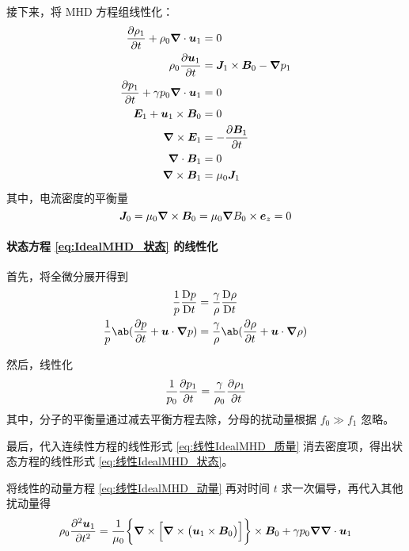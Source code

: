接下来，将 MHD 方程组线性化：
\begin{subequations}\begin{align}
\pdv{\rho_1}{t} + \rho_0 \bm{\nabla} \cdot{\bm{u}_1} &= 0
\label{eq:线性IdealMHD_质量} \\
\rho_0 \pdv{\bm{u}_1}{t} &= \bm{J}_1 \times \bm{B}_0 - \bm{\nabla}{p_1}
\label{eq:线性IdealMHD_动量} \\
\pdv{p_1}{t} + \gamma p_0 \bm{\nabla} \cdot{\bm{u}_1} &= 0
\label{eq:线性IdealMHD_状态} \\
\bm{E}_1 + \bm{u}_1 \times \bm{B}_0 &= 0 \\
\bm{\nabla} \times{\bm{E}_1} &= - \pdv{\bm{B}_1}{t} \\
\bm{\nabla} \cdot{\bm{B}_1} &= 0 \\
\bm{\nabla} \times{\bm{B}_1} &= \mu_0 \bm{J}_1
\end{align}\end{subequations}
其中，电流密度的平衡量
\begin{equation}
\bm{J}_0 = \mu_0 \bm{\nabla} \times{\bm{B}_0} = \mu_0 \bm{\nabla}{B_0} \times \bm{e}_z = 0
\end{equation}

\paragraph{状态方程 \ref{eq:IdealMHD_状态} 的线性化}
首先，将全微分展开得到
\begin{equation}\begin{aligned}
\frac{1}{p} \mdv{p}{t} &= \frac{\gamma}{\rho} \mdv{\rho}{t} \\
\frac{1}{p} \ab(\pdv{p}{t} + \vec{u} \cdot \grad{p})
&= \frac{\gamma}{\rho} \ab(\pdv{\rho}{t} + \vec{u} \cdot \grad{\rho})
\end{aligned}\end{equation}

然后，线性化
\begin{equation}
\frac{1}{p_0} \pdv{p_1}{t}
= \frac{\gamma}{\rho_0} \pdv{\rho_1}{t}
\end{equation}
其中，分子的平衡量通过减去平衡方程去除，分母的扰动量根据 $f_0 \gg f_1$ 忽略。

最后，代入连续性方程的线性形式 \ref{eq:线性IdealMHD_质量} 消去密度项，得出状态方程的线性形式 \ref{eq:线性IdealMHD_状态}。

将线性的动量方程 \ref{eq:线性IdealMHD_动量} 再对时间 $t$ 求一次偏导，再代入其他扰动量得
\begin{equation}
\rho_0 \pdv[2]{\bm{u}_1}{t}
= \frac{1}{\mu_0} \bigg\{ \bm{\nabla} \times{\Big[ \bm{\nabla} \times {\big( \bm{u}_1 \times \bm{B}_0 \big)} \Big]} \bigg\} \times \bm{B}_0
+ \gamma p_0 \bm{\nabla}{\bm{\nabla} \cdot{\bm{u}_1}}
\end{equation}


